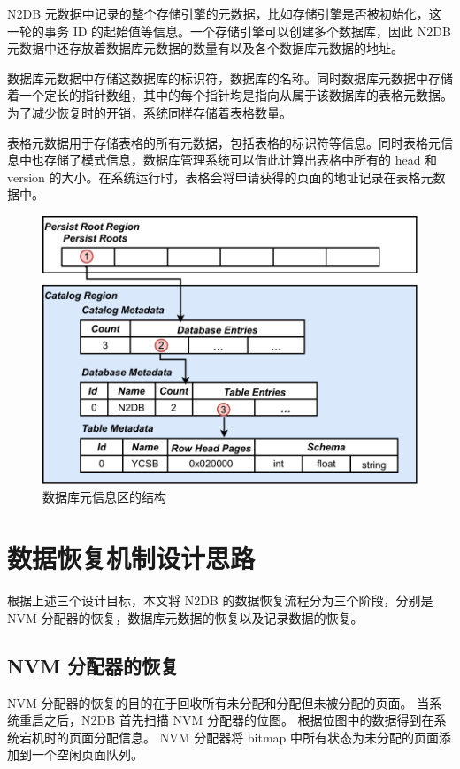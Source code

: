 N2DB 元数据中记录的整个存储引擎的元数据，比如存储引擎是否被初始化，这一轮的事务 ID 的起始值等信息。一个存储引擎可以创建多个数据库，因此 N2DB 元数据中还存放着数据库元数据的数量有以及各个数据库元数据的地址。

数据库元数据中存储这数据库的标识符，数据库的名称。同时数据库元数据中存储着一个定长的指针数组，其中的每个指针均是指向从属于该数据库的表格元数据。为了减少恢复时的开销，系统同样存储着表格数量。


表格元数据用于存储表格的所有元数据，包括表格的标识符等信息。同时表格元信息中也存储了模式信息，数据库管理系统可以借此计算出表格中所有的 head 和 version 的大小。在系统运行时，表格会将申请获得的页面的地址记录在表格元数据中。


\begin{figure}
    \centering
    \includegraphics[width=1\linewidth]{figures/catalog.pdf}
    \caption{数据库元信息区的结构}
    \label{fig:catalog}
\end{figure}

\section{数据恢复机制设计思路}

根据上述三个设计目标，本文将 N2DB 的数据恢复流程分为三个阶段，分别是 NVM 分配器的恢复，数据库元数据的恢复以及记录数据的恢复。

\subsection{NVM 分配器的恢复}
\label{ssec:allocator-recovery}

NVM 分配器的恢复的目的在于回收所有未分配和分配但未被分配的页面。
当系统重启之后，N2DB 首先扫描 NVM 分配器的位图。
根据位图中的数据得到在系统宕机时的页面分配信息。
NVM 分配器将 bitmap 中所有状态为未分配的页面添加到一个空闲页面队列。


